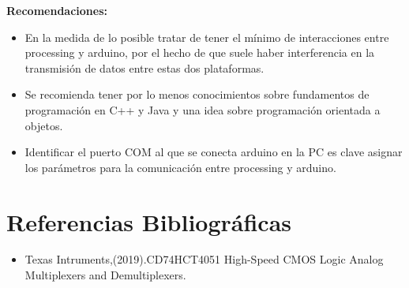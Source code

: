 \documentclass[10pt,a4paper]{article}
\begin{document}
 
\textbf{Recomendaciones:}
\begin{itemize}
\item En la medida de lo posible tratar de tener el mínimo de interacciones entre processing y arduino, por el hecho de que suele haber interferencia en la transmisión de datos entre estas dos plataformas.
\item Se recomienda tener por lo menos conocimientos sobre fundamentos de programación en C++ y Java y una idea sobre programación orientada a objetos.
\item Identificar el puerto COM al que se conecta arduino en la PC es clave asignar los parámetros para la comunicación entre processing y arduino.
 
\end{itemize}
\section{Referencias Bibliográficas}

\begin{itemize}
\item Texas Intruments,(2019).CD74HCT4051 High-Speed CMOS Logic Analog Multiplexers and Demultiplexers.


\end{itemize}
\end{document}
